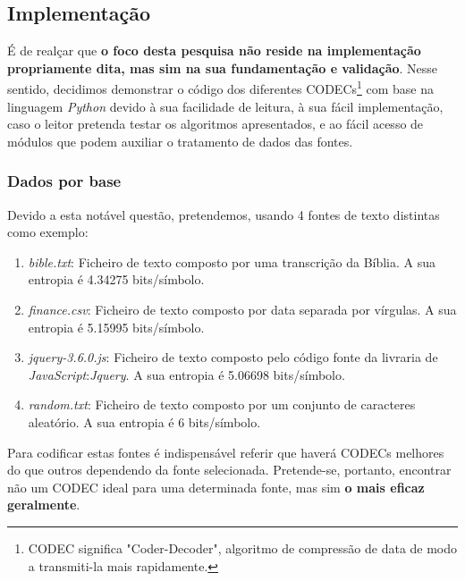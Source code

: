 \documentclass[11pt,journal,compsoc]{IEEEtran}
\begin{document}
    
    
    \subsection{Implementação}
    
    
    É de realçar que \textbf{o foco desta pesquisa não reside na implementação propriamente dita, mas sim na sua fundamentação e validação}. Nesse sentido, decidimos demonstrar o código dos diferentes CODECs\footnote{CODEC significa "Coder-Decoder", algoritmo de compressão de data de modo a transmiti-la mais rapidamente.} com base na linguagem \textit{Python} devido à sua facilidade de leitura, à sua fácil implementação, caso o leitor pretenda testar os algoritmos apresentados, e ao fácil acesso de módulos que podem auxiliar o tratamento de dados das fontes.
    
    \IEEEpubidadjcol
    
    \subsubsection{Dados por base}
    Devido a esta notável questão, pretendemos, usando 4 fontes de texto distintas como exemplo:
    \begin{enumerate}
        \item \textit{bible.txt}: Ficheiro de texto composto por uma transcrição da Bíblia. A sua entropia é 4.34275 bits/símbolo.
        \item \textit{finance.csv}: Ficheiro de texto composto por data separada por vírgulas. A sua entropia é 5.15995 bits/símbolo.
        \item \textit{jquery-3.6.0.js}: Ficheiro de texto composto pelo código fonte da livraria de \textit{JavaScript}:\textit{Jquery}. A sua entropia é 5.06698 bits/símbolo.
        \item \textit{random.txt}: Ficheiro de texto composto por um conjunto de caracteres aleatório. A sua entropia é 6 bits/símbolo.
    \end{enumerate}
    
    Para codificar estas fontes é indispensável referir que haverá CODECs melhores do que outros dependendo da fonte selecionada. Pretende-se, portanto, encontrar não um CODEC ideal para uma determinada fonte, mas sim \textbf{o mais eficaz geralmente}. 
    
\end{document}
